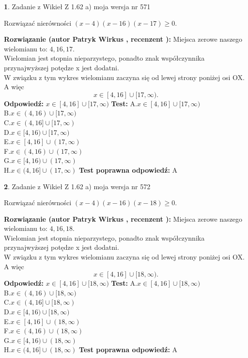 \documentclass[12pt, a4paper]{article}
\theoremstyle{definition} %
\newtheorem{zad}{}
\newcommand{\zadStart}[1]{\begin{zad}#1\newline}
\newcommand{\zadStop}{\end{zad}}
\newcommand{\rozwStart}[2]{\noindent \textbf{Rozwiązanie (autor #1 , recenzent #2): }\newline}
\newcommand{\rozwStop}{\newline}
\newcommand{\odpStart}{\noindent \textbf{Odpowiedź:}\newline}
\newcommand{\odpStop}{\newline}
\newcommand{\testStart}{\noindent \textbf{Test:}\newline}
\newcommand{\testStop}{\newline}
\newcommand{\kluczStart}{\noindent \textbf{Test poprawna odpowiedź:}\newline}
\newcommand{\kluczStop}{\newline}
\begin{document}
\zadStart{Zadanie z Wikieł Z 1.62 a) moja wersja nr 571}

Rozwiązać nierówności $(x-4)(x-16)(x-17)\ge0$.
\zadStop
\rozwStart{Patryk Wirkus}{}
Miejsca zerowe naszego wielomianu to: $4, 16, 17$.\\
Wielomian jest stopnia nieparzystego, ponadto znak współczynnika przy\linebreak najwyższej potędze x jest dodatni.\\ W związku z tym wykres wielomianu zaczyna się od lewej strony poniżej osi OX. A więc $$x \in [4,16] \cup [17,\infty).$$
\rozwStop
\odpStart
$x \in [4,16] \cup [17,\infty)$
\odpStop
\testStart
A.$x \in [4,16] \cup [17,\infty)$\\
B.$x \in (4,16) \cup [17,\infty)$\\
C.$x \in (4,16] \cup [17,\infty)$\\
D.$x \in [4,16) \cup [17,\infty)$\\
E.$x \in [4,16] \cup (17,\infty)$\\
F.$x \in (4,16) \cup (17,\infty)$\\
G.$x \in [4,16) \cup (17,\infty)$\\
H.$x \in (4,16] \cup (17,\infty)$
\testStop
\kluczStart
A
\kluczStop



\zadStart{Zadanie z Wikieł Z 1.62 a) moja wersja nr 572}

Rozwiązać nierówności $(x-4)(x-16)(x-18)\ge0$.
\zadStop
\rozwStart{Patryk Wirkus}{}
Miejsca zerowe naszego wielomianu to: $4, 16, 18$.\\
Wielomian jest stopnia nieparzystego, ponadto znak współczynnika przy\linebreak najwyższej potędze x jest dodatni.\\ W związku z tym wykres wielomianu zaczyna się od lewej strony poniżej osi OX. A więc $$x \in [4,16] \cup [18,\infty).$$
\rozwStop
\odpStart
$x \in [4,16] \cup [18,\infty)$
\odpStop
\testStart
A.$x \in [4,16] \cup [18,\infty)$\\
B.$x \in (4,16) \cup [18,\infty)$\\
C.$x \in (4,16] \cup [18,\infty)$\\
D.$x \in [4,16) \cup [18,\infty)$\\
E.$x \in [4,16] \cup (18,\infty)$\\
F.$x \in (4,16) \cup (18,\infty)$\\
G.$x \in [4,16) \cup (18,\infty)$\\
H.$x \in (4,16] \cup (18,\infty)$
\testStop
\kluczStart
A
\kluczStop
\end{document}
